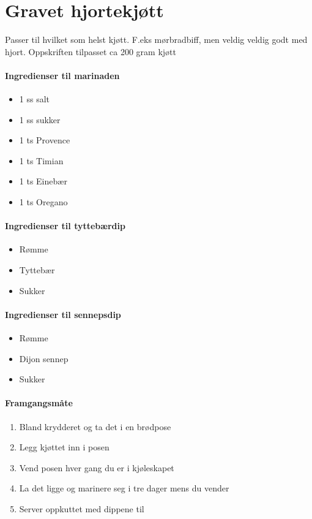 \section{﻿Gravet hjortekjøtt}
Passer til hvilket som helst kjøtt. F.eks mørbradbiff, men veldig veldig godt med hjort.
Oppskriften tilpasset ca 200 gram kjøtt

\paragraph{Ingredienser til marinaden}
\begin{itemize}[noitemsep]
	\item 1 ss salt
	\item 1 ss sukker
	\item 1 ts Provence
	\item 1 ts Timian
	\item 1 ts Einebær
	\item 1 ts Oregano
\end{itemize}

\paragraph{Ingredienser til tyttebærdip}
\begin{itemize}[noitemsep]
	\item Rømme
	\item Tyttebær
	\item Sukker
\end{itemize}

\paragraph{Ingredienser til sennepsdip}
\begin{itemize}[noitemsep]
	\item Rømme
	\item Dijon sennep
	\item Sukker
\end{itemize}

\paragraph{Framgangsmåte}
\begin{enumerate}[noitemsep]
	\item Bland krydderet og ta det i en brødpose
	\item Legg kjøttet inn i posen
	\item Vend posen hver gang du er i kjøleskapet
	\item La det ligge og marinere seg i tre dager mens du vender
	\item Server oppkuttet med dippene til
\end{enumerate}
